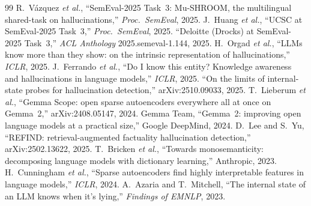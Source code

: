 \documentclass[conference]{IEEEtran}
\begin{document}
\clearpage
\begin{thebibliography}{99}
 R.~V\'azquez \emph{et al.}, ``SemEval-2025 Task~3:
Mu-SHROOM, the multilingual shared-task on hallucinations,''
\emph{Proc.\ SemEval}, 2025. 
 J.~Huang \emph{et al.}, ``UCSC at SemEval-2025 Task~3,''
\emph{Proc.\ SemEval}, 2025. 
 ``Deloitte (Drocks) at SemEval-2025 Task~3,''
\emph{ACL Anthology} 2025.semeval-1.144, 2025. 
 H.~Orgad \emph{et al.}, ``LLMs know more than they show:
on the intrinsic representation of hallucinations,'' \emph{ICLR}, 2025.
 J.~Ferrando \emph{et al.}, ``Do I know this entity?
Knowledge awareness and hallucinations in language models,''
\emph{ICLR}, 2025.
 ``On the limits of internal-state probes for hallucination
detection,'' arXiv:2510.09033, 2025.
 T.~Lieberum \emph{et al.}, ``Gemma Scope: open sparse
autoencoders everywhere all at once on Gemma~2,'' arXiv:2408.05147, 2024.
 Gemma Team, ``Gemma~2: improving open language models at a
practical size,'' Google DeepMind, 2024.
 D.~Lee and S.~Yu, ``REFIND: retrieval-augmented factuality
hallucination detection,'' arXiv:2502.13622, 2025. 
 T.~Bricken \emph{et al.}, ``Towards monosemanticity:
decomposing language models with dictionary learning,'' Anthropic, 2023.
 H.~Cunningham \emph{et al.}, ``Sparse autoencoders find
highly interpretable features in language models,'' \emph{ICLR}, 2024.
 A.~Azaria and T.~Mitchell, ``The internal state of an LLM
knows when it's lying,'' \emph{Findings of EMNLP}, 2023. 
\end{thebibliography}
\end{document}
